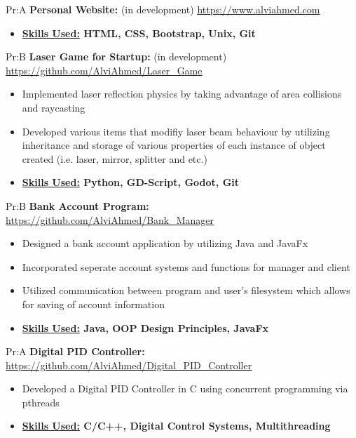 

Pr:A
\vspace{\spaces}
\textbf{Personal Website: }  (in development)
\underline{\url{https://www.alviahmed.com}}
\begin{itemize}[noitemsep,nolistsep]
\item \textbf{\underline{Skills Used:} HTML, CSS, Bootstrap, Unix, Git}
\end{itemize}


Pr:B
\vspace{\spaces}
\textbf{Laser Game for Startup: } (in development)
\underline{\url{https://github.com/AlviAhmed/Laser_Game}}
\begin{itemize}[noitemsep,nolistsep]
\item Implemented laser reflection physics by taking advantage of area collisions and raycasting
\item Developed various items that modifiy laser beam behaviour by utilizing inheritance and storage of
  various properties of each instance of object created (i.e. laser, mirror, splitter and etc.)
\item \textbf{\underline{Skills Used:} Python, GD-Script, Godot, Git}
\end{itemize}


Pr:B
\vspace{\spaces}
\textbf{Bank Account Program: }
\underline{\url{https://github.com/AlviAhmed/Bank_Manager}}
\begin{itemize}[noitemsep,nolistsep]
\item Designed a bank account application by utilizing Java and JavaFx
\item Incorporated seperate account systems and functions for manager and client 
\item Utilized communication between program and user's filesystem which allows for saving of account information 
\item \textbf{\underline{Skills Used:} Java, OOP Design Principles, JavaFx}
\end{itemize}


Pr:A
\vspace{\spaces}
\textbf{Digital PID Controller: }
\underline{\url{https://github.com/AlviAhmed/Digital_PID_Controller}}
\begin{itemize}[noitemsep,nolistsep]
\item Developed a Digital PID Controller in C using concurrent programming via pthreads
\item \textbf{ \underline{Skills Used:} C/C++, Digital Control Systems, Multithreading}
\end{itemize}


